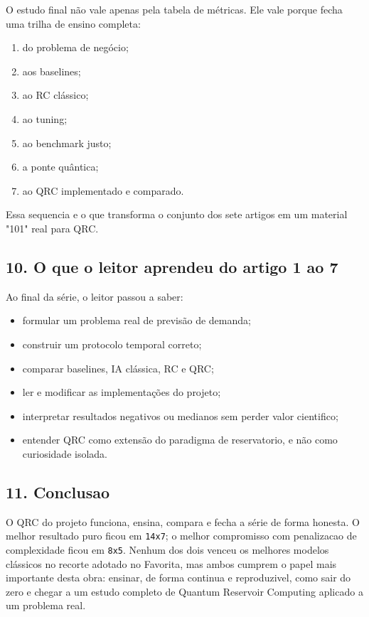 \documentclass[12pt]{article}
\providecommand{\tightlist}{%
          \setlength{\itemsep}{0pt}\setlength{\parskip}{0pt}}
\begin{document}
O estudo final não vale apenas pela tabela de métricas. Ele vale porque fecha uma trilha de ensino completa:

\begin{enumerate}
\def\labelenumi{\arabic{enumi}.}
\tightlist
\item
  do problema de negócio;
\item
  aos baselines;
\item
  ao RC clássico;
\item
  ao tuning;
\item
  ao benchmark justo;
\item
  a ponte quântica;
\item
  ao QRC implementado e comparado.
\end{enumerate}

Essa sequencia e o que transforma o conjunto dos sete artigos em um material "101" real para QRC.

\subsection{10. O que o leitor aprendeu do artigo 1 ao 7}\label{10-o-que-o-leitor-aprendeu-do-artigo-1-ao-7}

Ao final da série, o leitor passou a saber:

\begin{itemize}
\tightlist
\item
  formular um problema real de previsão de demanda;
\item
  construir um protocolo temporal correto;
\item
  comparar baselines, IA clássica, RC e QRC;
\item
  ler e modificar as implementações do projeto;
\item
  interpretar resultados negativos ou medianos sem perder valor cientifico;
\item
  entender QRC como extensão do paradigma de reservatorio, e não como curiosidade isolada.
\end{itemize}

\subsection{11. Conclusao}\label{11-conclusao}

O QRC do projeto funciona, ensina, compara e fecha a série de forma honesta. O melhor resultado puro ficou em \texttt{14x7}; o melhor compromisso com penalizacao de complexidade ficou em \texttt{8x5}. Nenhum dos dois venceu os melhores modelos clássicos no recorte adotado no Favorita, mas ambos cumprem o papel mais importante desta obra: ensinar, de forma continua e reproduzivel, como sair do zero e chegar a um estudo completo de Quantum Reservoir Computing aplicado a um problema real.
\end{document}
